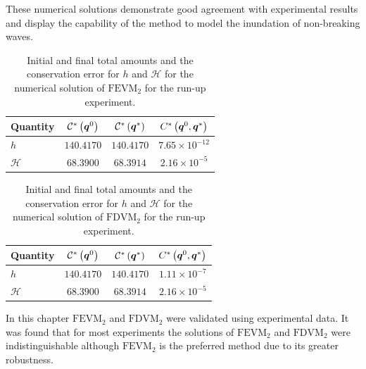 These numerical solutions demonstrate good agreement with experimental results and display the capability of the method to model the inundation of non-breaking waves.

\begin{table}
	\centering
	\begin{tabular}{l  c  c c}
		Quantity& $\mathcal{C}^*\left(\boldsymbol{q}^0\right)$ & $\mathcal{C}^*\left(\boldsymbol{q}^*\right)$ & ${C}^*\left(\boldsymbol{q}^0,\boldsymbol{q}^*\right)$  \B\\
		\hline 
		$h$ & $140.4170$ & $140.4170$ & $7.65\times 10^{-12}$ \T \\
		$\mathcal{H}$ & $68.3900$ & $68.3914$ & $2.16 \times 10^{-5}$ \B\\
		\hline
	\end{tabular}
	\caption{Initial and final total amounts and the conservation error for $h$ and $\mathcal{H}$ for the numerical solution of $\text{FEVM}_2$ for the run-up experiment.}
	\label{tab:ConservationSynFEVM}
\end{table}
\begin{table}
	\centering
	\begin{tabular}{l  c  c c}
		Quantity& $\mathcal{C}^*\left(\boldsymbol{q}^0\right)$ & $\mathcal{C}^*\left(\boldsymbol{q}^*\right)$ & ${C}^*\left(\boldsymbol{q}^0,\boldsymbol{q}^*\right)$ \B \\
		\hline
		$h$ & $140.4170$ & $140.4170$ & $1.11\times 10^{-7}$ \T\\
		$\mathcal{H}$ & $68.3900$ & $68.3914$ & $2.16 \times 10^{-5}$ \B \\
		\hline
	\end{tabular}
	\caption{Initial and final total amounts and the conservation error for $h$ and $\mathcal{H}$ for the numerical solution of $\text{FDVM}_2$ for the run-up experiment.}
	\label{tab:ConservationSynFDVM}
\end{table}

\medskip
In this chapter $\text{FEVM}_2$ and $\text{FDVM}_2$ were validated using experimental data. It was found that for most experiments the solutions of $\text{FEVM}_2$ and $\text{FDVM}_2$ were indistinguishable although $\text{FEVM}_2$ is the preferred method due to its greater robustness. 

